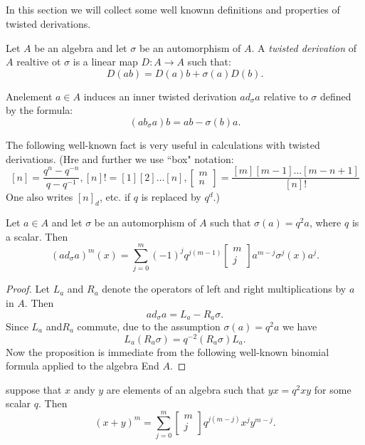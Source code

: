 \subsection{}\label{chap4-subsec-1.1}
In this section we will collect some well knownn definitions and properties of twisted derivations.

Let $A$ be an algebra and let $\sigma$ be an automorphism of $A$. A \textit{twisted derivation} of $A$ realtive ot $\sigma$ is a linear map $D:A\rightarrow A$ such that:
$$
D(ab)=D(a)b+ \sigma(a)D(b).
$$

\begin{example*}
An\pageoriginale element $a\in A$ induces an inner twisted derivation $ad_{\sigma}a$ relative to $\sigma$ defined by the formula:
$$
(ab_{\sigma}a)b=ab-\sigma(b)a.
$$

The following well-known fact is very useful in calculations with twisted derivations. (Hre and further we use ``box" notation:
$$ [n] = \dfrac{q^{n}-q^{-n}}{q-q^{-1}}, [n]! = [1][2]\ldots[n],
\begin{bmatrix}
m\\
n
\end{bmatrix}
= \dfrac{[m][m-1]\ldots[m-n+1]}{[n]!}
$$
One also writes $[n]_{d}$, etc. if $q$ is replaced by $q^{d}$.)
\end{example*}

\begin{prop*}
Let $a\in A$ and let $\sigma$ be an automorphism of $A$ such that $\sigma(a) = q^{2}a$, where $q$ is a scalar. Then
$$
(ad_{\sigma}a)^{m}(x)=\sum\limits_{j=0}^{m}(-1)^{j}q^{j(m-1)}
\begin{bmatrix}
m\\
j
\end{bmatrix}
a^{m-j}\sigma^{j}(x)a^{j}.
$$
\end{prop*}

\begin{proof}
Let $L_{a}$ and $R_{a}$ denote the operators of left and right multiplications by $a$ in $A$. Then
$$
ad_{\sigma}a= L_{a}-R_{a}\sigma.
$$
Since $L_{a}$ and$R_{a}$ commute, due to the assumption $\sigma(a)=q^{2}a$ we have
$$
L_{a}(R_{a}\sigma)=q^{-2}(R_{a}\sigma)L_{a}.
$$
Now the proposition is immediate from the following well-known binomial formula applied to the algebra End $A$.
\end{proof}

\begin{lemma*}
suppose that $x$ andy $y$ are elements of an algebra such that $yx=q^{2}xy$ for some scalar $q$. Then
$$
(x+y)^{m} = \sum\limits_{j=0}^{m}
\begin{bmatrix}
m\\
j
\end{bmatrix}
q^{j(m-j)}x^{j}y^{m-j}.
$$
\end{lemma*}

